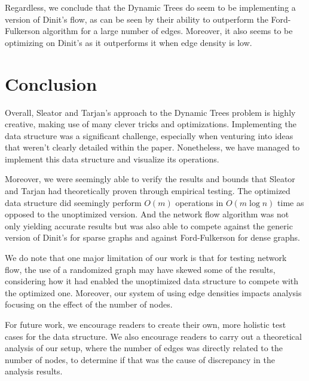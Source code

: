 \documentclass[a4paper, 11pt]{article}
\begin{document}
Regardless, we conclude that the Dynamic Trees do seem to be implementing a version of Dinit’s flow, as can be seen by their ability to outperform the Ford-Fulkerson algorithm for a large number of edges. Moreover, it also seems to be optimizing on Dinit’s as it outperforms it when edge density is low.

\pagebreak

\section{Conclusion}
Overall, Sleator and Tarjan’s approach to the Dynamic Trees problem is highly creative, making use of many clever tricks and optimizations. Implementing the data structure was a significant challenge, especially when venturing into ideas that weren’t clearly detailed within the paper. Nonetheless, we have managed to implement this data structure and visualize its operations.

Moreover, we were seemingly able to verify the results and bounds that Sleator and Tarjan had theoretically proven through empirical testing. The optimized data structure did seemingly perform \(O(m)\) operations in \(O(m \log n)\) time as opposed to the unoptimized version. And the network flow algorithm was not only yielding accurate results but was also able to compete against the generic version of Dinit’s for sparse graphs and against Ford-Fulkerson for dense graphs.

We do note that one major limitation of our work is that for testing network flow, the use of a randomized graph may have skewed some of the results, considering how it had enabled the unoptimized data structure to compete with the optimized one. Moreover, our system of using edge densities impacts analysis focusing on the effect of the number of nodes.

For future work, we encourage readers to create their own, more holistic test cases for the data structure. We also encourage readers to carry out a theoretical analysis of our setup, where the number of edges was directly related to the number of nodes, to determine if that was the cause of discrepancy in the analysis results.

\pagebreak
\end{document}
